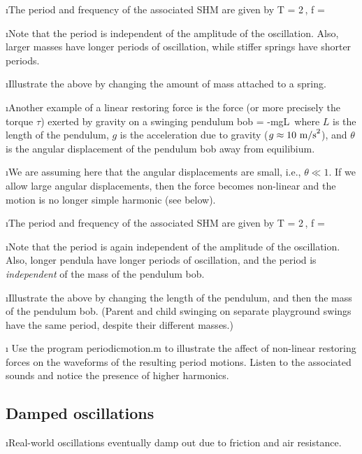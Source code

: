 \i The period and frequency of the associated SHM are
given by
%
\be
T = {2\pi}\,,
\quad
f = 
\ee

\i Note that the period is independent of the amplitude
of the oscillation.
Also, larger masses have longer periods of 
oscillation, while stiffer springs have shorter periods.

\i \demo Illustrate the above by changing the amount of mass
attached to a spring.

\i Another example of a linear restoring force is the force 
(or more precisely the torque $\tau$) 
exerted by gravity on a swinging pendulum bob
%
\be
\tau =  -mgL\,\theta
\ee
%
where $L$ is the length of the pendulum,
$g$ is the acceleration due to gravity ($g\approx 10~{\rm m/s}^2$),
and $\theta$ is the angular displacement of the pendulum 
bob away from equilibium.

\i We are assuming here that the angular displacements
are small, i.e., $\theta \ll 1$.
If we allow large angular displacements, then the force becomes 
non-linear and the motion is no longer simple harmonic
(see below).

\i The period and frequency of the associated SHM are
given by
%
\be
T = {2\pi}\,,
\quad
f = 
\ee

\i Note that the period is again independent of the amplitude
of the oscillation.
Also, longer pendula have longer periods of oscillation, and
the period is {\em independent} of the mass of the pendulum bob.

\i \demo Illustrate the above by changing the length of the 
pendulum, and then the mass of the pendulum bob.
(Parent and child swinging on separate playground swings
have the same period, despite their different masses.)

\i \demo
Use the program periodicmotion.m to illustrate the affect
of non-linear restoring forces on the waveforms of the 
resulting period motions.
Listen to the associated sounds and notice the presence of 
higher harmonics.

\ei

\subsection{Damped oscillations}

\bi

\i Real-world oscillations eventually damp out due to 
friction and air resistance.

